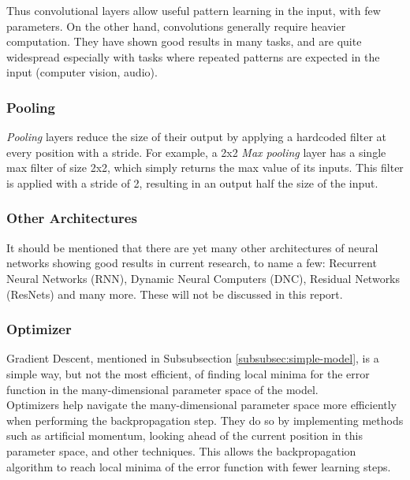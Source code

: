 Thus convolutional layers allow useful pattern learning in the input, with few parameters. On the other hand, convolutions generally require heavier computation. They have shown good results in many tasks, and are quite widespread especially with tasks where repeated patterns are expected in the input (computer vision, audio).\\

\subsubsection{Pooling}

\textit{Pooling} layers reduce the size of their output by applying a hardcoded filter at every position with a stride. For example, a 2x2 \textit{Max pooling} layer has a single max filter of size 2x2, which simply returns the max value of its inputs. This filter is applied with a stride of 2, resulting in an output half the size of the input.\\

\subsubsection{Other Architectures}

It should be mentioned that there are yet many other architectures of neural networks showing good results in current research, to name a few: Recurrent Neural Networks (RNN), Dynamic Neural Computers (DNC), Residual Networks (ResNets) and many more. These will not be discussed in this report.\\

\subsubsection{Optimizer}

Gradient Descent, mentioned in Subsubsection \ref{subsubsec:simple-model}, is a simple way, but not the most efficient, of finding local minima for the error function in the many-dimensional parameter space of the model.\\

Optimizers help navigate the many-dimensional parameter space more efficiently when performing the backpropagation step. They do so by implementing methods such as artificial momentum, looking ahead of the current position in this parameter space, and other techniques. This allows the backpropagation algorithm to reach local minima of the error function with fewer learning steps.\\

